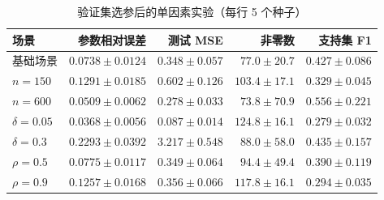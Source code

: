 \begin{table}[htbp]
\centering\small
\caption{验证集选参后的单因素实验（每行 5 个种子）}\label{tab:sensitivity}
\begin{tabular}{lrrrr}
\toprule
场景 & 参数相对误差 & 测试 MSE & 非零数 & 支持集 F1 \\
\midrule
基础场景 & $0.0738\pm0.0124$ & $0.348\pm0.057$ & $77.0\pm20.7$ & $0.427\pm0.086$ \\
$n=150$ & $0.1291\pm0.0185$ & $0.602\pm0.126$ & $103.4\pm17.1$ & $0.329\pm0.045$ \\
$n=600$ & $0.0509\pm0.0062$ & $0.278\pm0.033$ & $73.8\pm70.9$ & $0.556\pm0.221$ \\
$\delta=0.05$ & $0.0368\pm0.0056$ & $0.087\pm0.014$ & $124.8\pm16.1$ & $0.279\pm0.032$ \\
$\delta=0.3$ & $0.2293\pm0.0392$ & $3.217\pm0.548$ & $88.0\pm58.0$ & $0.435\pm0.157$ \\
$\rho=0.5$ & $0.0775\pm0.0117$ & $0.349\pm0.064$ & $94.4\pm49.4$ & $0.390\pm0.119$ \\
$\rho=0.9$ & $0.1257\pm0.0168$ & $0.356\pm0.066$ & $117.8\pm16.1$ & $0.294\pm0.035$ \\
\bottomrule
\end{tabular}
\par\vspace{0.3em}{\footnotesize 基础场景为 $n=300,\ \rho=0,\ \delta=0.1$；每行只改变标出的一个因素。}
\end{table}
